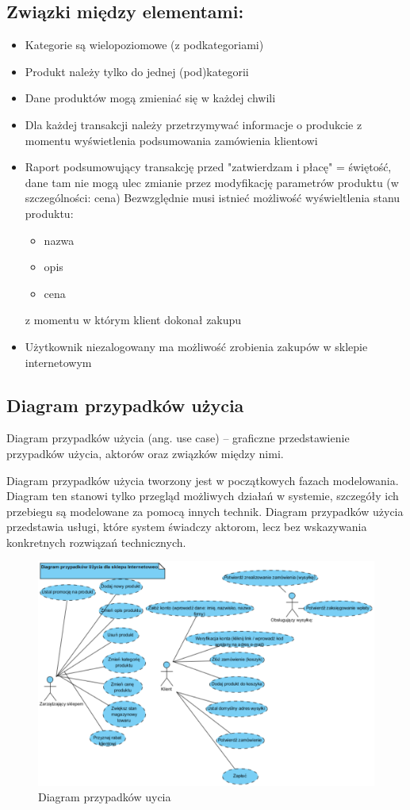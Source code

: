 \subsection{Związki między elementami:}
\begin{itemize}
\item Kategorie są wielopoziomowe (z podkategoriami)
\item Produkt należy tylko do jednej (pod)kategorii
\item Dane produktów mogą zmieniać się w każdej chwili
\item Dla każdej transakcji należy przetrzymywać informacje o produkcie z momentu wyświetlenia podsumowania zamówienia klientowi
\item Raport podsumowujący transakcję przed "zatwierdzam i płacę" = świętość, dane tam nie mogą ulec zmianie przez modyfikację parametrów produktu (w szczególności: cena)
Bezwzględnie musi istnieć możliwość wyświeltlenia stanu produktu:
\begin{itemize}
	\item nazwa
	\item opis
	\item cena
\end{itemize}
z momentu  w którym klient dokonał zakupu
\item Użytkownik niezalogowany ma możliwość zrobienia zakupów w sklepie internetowym
\end{itemize}

\subsection{Diagram przypadków użycia}

Diagram przypadków użycia (ang. use case) – graficzne przedstawienie przypadków użycia, aktorów oraz związków między nimi.

Diagram przypadków użycia tworzony jest w początkowych fazach modelowania. Diagram ten stanowi tylko przegląd możliwych działań w systemie, szczegóły ich przebiegu są modelowane za pomocą innych technik. Diagram przypadków użycia przedstawia usługi, które system świadczy aktorom, lecz bez wskazywania konkretnych rozwiązań technicznych.

\begin{figure} [H]
	\centering
	\includegraphics[width=15 cm] {fig/use_case_diagram}
	\caption{Diagram przypadków uycia}
	\label{fig:use_case_diagram}
\end{figure}
